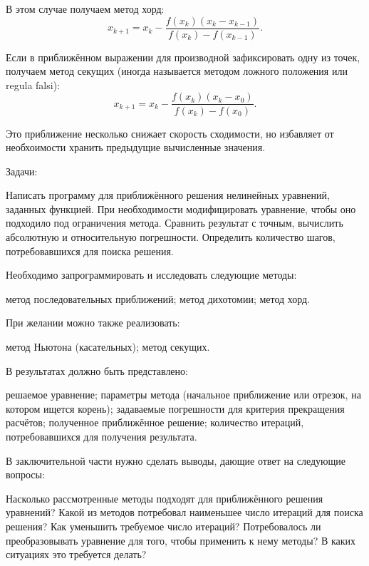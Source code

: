 В этом случае получаем метод хорд:
\[
x_{k+1}=x_{k}-\frac{f(x_{k})(x_{k}-x_{k-1})}{f(x_{k})-f(x_{k-1})}.
\]


Если в приближённом выражении для производной зафиксировать одну из
точек, получаем метод секущих (иногда называется методом ложного положения
или regula falsi):
\[
x_{k+1}=x_{k}-\frac{f(x_{k})(x_{k}-x_{0})}{f(x_{k})-f(x_{0})}.
\]


Это приближение несколько снижает скорость сходимости, но избавляет от
необхоимости хранить предыдущие вычисленные значения.

Задачи:

Написать программу для приближённого решения нелинейных уравнений,
заданных функцией. При необходимости модифицировать уравнение, чтобы
оно подходило под ограничения метода. Сравнить результат с точным,
вычислить абсолютную и относительную погрешности. Определить количество
шагов, потребовавшихся для поиска решения.

Необходимо запрограммировать и исследовать следующие методы:

метод последовательных приближений; метод дихотомии; метод хорд.

При желании можно также реализовать:

метод Ньютона (касательных); метод секущих.

В результатах должно быть представлено:

решаемое уравнение; параметры метода (начальное приближение или отрезок,
на котором ищется корень); задаваемые погрешности для критерия прекращения
расчётов; полученное приближённое решение; количество итераций, потребовавшихся
для получения результата.

В заключительной части нужно сделать выводы, дающие ответ на следующие
вопросы:

Насколько рассмотренные методы подходят для приближённого решения
уравнений? Какой из методов потребовал наименьшее число итераций для
поиска решения? Как уменьшить требуемое число итераций? Потребовалось
ли преобразовывать уравнение для того, чтобы применить к нему методы?
В каких ситуациях это требуется делать?
